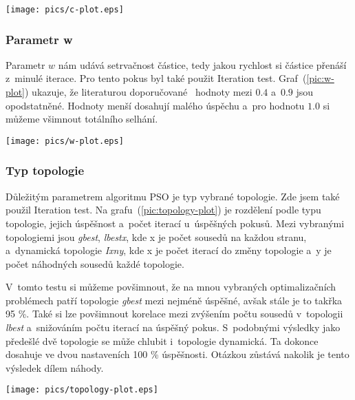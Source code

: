 \documentclass[12pt,a4paper,fleqn]{article}
\begin{document}
\begin{figure*}[h!]
\centering
\texttt{[image: pics/c-plot.eps]}
\caption{Závislost počtu iterací a~úspěchu vyhledávání na parametru c}
\label{pic:c-plot}
\end{figure*}

\subsubsection*{Parametr w}
Parametr $w$ nám udává setrvačnost částice, tedy jakou rychlost si částice přenáší z~minulé iterace. Pro tento pokus byl také použit Iteration test. Graf~(\ref{pic:w-plot}) ukazuje, že literaturou doporučované~\cite{poli2007particle} hodnoty mezi $0.4$ a~$0.9$ jsou opodstatněné. Hodnoty menší dosahují malého úspěchu a~pro hodnotu $1.0$ si můžeme všimnout totálního selhání.
\begin{figure*}[h!]
\centering
\texttt{[image: pics/w-plot.eps]}
\caption{Závislost počtu iterací a~úspěchu vyhledávání na parametru w}
\label{pic:w-plot}
\end{figure*}

\subsubsection*{Typ topologie}
Důležitým parametrem algoritmu PSO je typ vybrané topologie. Zde jsem také použil Iteration test. Na grafu~(\ref{pic:topology-plot}) je rozdělení podle typu topologie, jejich úspěšnost a~počet iterací u~úspěšných pokusů. Mezi vybranými topologiemi jsou \textit{gbest}, \textit{lbestx}, kde x je počet sousedů na každou stranu, a~dynamická topologie \textit{Ixny}, kde x je počet iterací do změny topologie a~y je počet náhodných sousedů každé topologie.

V~tomto testu si můžeme povšimnout, že na mnou vybraných optimalizačních problémech patří topologie \textit{gbest} mezi nejméně úspěšné, avšak stále je to takřka 95 \%. Také si lze povšimnout korelace mezi zvýšením počtu sousedů v~topologii \textit{lbest} a~snižováním počtu iterací na úspěšný pokus. S~podobnými výsledky jako předešlé dvě topologie se může chlubit i~topologie dynamická. Ta dokonce dosahuje ve dvou nastaveních 100 \% úspěšnosti. Otázkou zůstává nakolik je tento výsledek dílem náhody.

\begin{figure*}[h!]
\centering
\texttt{[image: pics/topology-plot.eps]}
\caption{Závislost počtu iterací a~úspěchu vyhledávání na typu topologie}
\label{pic:topology-plot}
\end{figure*}
\end{document}
